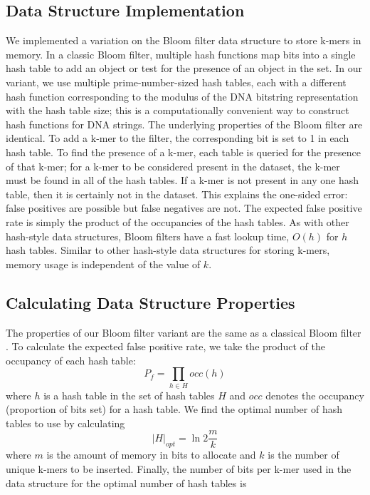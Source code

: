 \documentclass[12pt]{article} \usepackage{simplemargins}
\begin{document}
\subsection{Data Structure Implementation}
We implemented a variation on the Bloom filter data structure to store
k-mers in memory. In a classic Bloom filter, multiple hash functions
map bits into a single hash table to add an object or test for the presence
of an object in the set. In our variant, we use multiple
prime-number-sized hash tables, each with a different hash
function corresponding to the modulus of the DNA bitstring
representation with the hash table size; this is a computationally convenient way to construct hash functions for DNA strings.  The underlying properties of
the Bloom filter are identical.  To add a k-mer to the
filter, the corresponding bit is set to 1 in each hash table.  To find
the presence of a k-mer, each table is queried for the presence of
that k-mer; for a k-mer to be considered present in the dataset, the
k-mer must be found in all of the hash tables.  If a k-mer is not
present in any one hash table, then it is certainly not in the
dataset. This explains the one-sided error: false positives are
possible but false negatives are not. The expected false positive rate
is simply the product of the occupancies of the hash tables.  As with
other hash-style data structures, Bloom filters have a fast lookup
time, $O(h)$ for $h$ hash tables.  Similar to other hash-style data
structures for storing k-mers, memory usage is independent of the
value of $k$.

\subsection{Calculating Data Structure Properties}
The properties of our Bloom filter variant are the
same as a classical Bloom filter \cite{bloomsurvey}.
To calculate the expected false positive 
rate, we
take the product of the occupancy of each hash table:
\begin{displaymath}
P_f = \prod_{h \in H} occ(h)
\end{displaymath}
where $h$ is a hash table in the set of hash tables $H$ and $occ$ denotes
the occupancy (proportion of bits set) for a hash table.
We find the optimal number of hash tables
to use by calculating
\begin{displaymath}
\vert H \vert_{opt} = \ln 2 \frac{m}{k}
\end{displaymath}
where $m$ is the amount of memory in bits to allocate and $k$
is the number of unique k-mers to be inserted. Finally,
the number of bits per
k-mer used in the data structure for the optimal number of hash 
tables is
\end{document}
